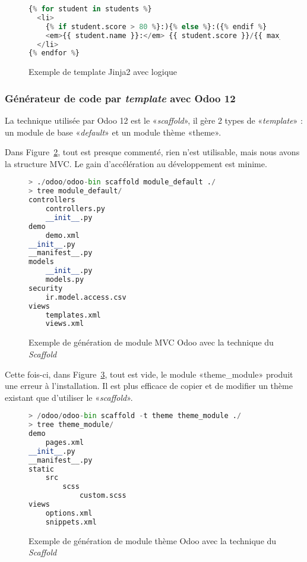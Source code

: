 \begin{figure}
\begin{lstlisting}[language=Python]
{% for student in students %}
  <li>
	{% if student.score > 80 %}:){% else %}:({% endif %}
	<em>{{ student.name }}:</em> {{ student.score }}/{{ max_score }}
  </li>
{% endfor %}
\end{lstlisting}
\caption{Exemple de template Jinja2 avec logique}
\label{fig:gen_code_template_template_2}
\end{figure}


\subsubsection{Générateur de code par \textit{template} avec Odoo 12}

La technique utilisée par Odoo 12 est le «\textit{scaffold}», il gère 2 types de «\textit{template}» : un module de base «\textit{default}» et un module thème «theme».

Dans Figure~\ref{fig:exemple_odoo_scaffold_module}, tout est presque commenté, rien n’est utilisable, mais nous avons la structure MVC. Le gain d’accélération au développement est minime.

\begin{figure}
\begin{lstlisting}[language=Python]
> ./odoo/odoo-bin scaffold module_default ./
> tree module_default/
controllers
    controllers.py
    __init__.py
demo
    demo.xml
__init__.py
__manifest__.py
models
    __init__.py
    models.py
security
    ir.model.access.csv
views
    templates.xml
	views.xml
\end{lstlisting}
\caption{Exemple de génération de module MVC Odoo avec la technique du \textit{Scaffold}}
\label{fig:exemple_odoo_scaffold_module}
\end{figure}

Cette fois-ci, dans Figure~\ref{fig:exemple_odoo_scaffold_theme}, tout est vide, le module «theme\_module» produit une erreur à l'installation. Il est plus efficace de copier et de modifier un thème existant que d'utiliser le «\textit{scaffold}».

\begin{figure}
\begin{lstlisting}[language=Python]
> /odoo/odoo-bin scaffold -t theme theme_module ./
> tree theme_module/
demo
    pages.xml
__init__.py
__manifest__.py
static
    src
        scss
            custom.scss
views
    options.xml
    snippets.xml
\end{lstlisting}
\caption{Exemple de génération de module thème Odoo avec la technique du \textit{Scaffold}}
\label{fig:exemple_odoo_scaffold_theme}
\end{figure}

